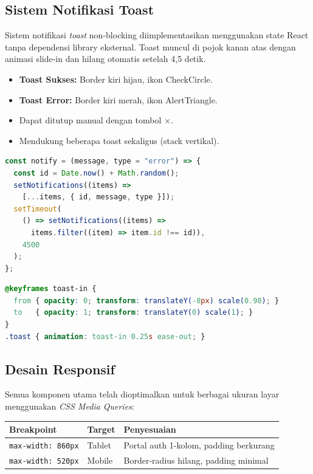 \documentclass[12pt,a4paper]{article}
\begin{document}
\subsection{Sistem Notifikasi Toast}

Sistem notifikasi \textit{toast} non-blocking diimplementasikan menggunakan state
React tanpa dependensi library eksternal. Toast muncul di pojok kanan atas dengan
animasi slide-in dan hilang otomatis setelah 4,5 detik.

\begin{itemize}[leftmargin=2em, itemsep=4pt]
  \item \textbf{Toast Sukses:} Border kiri hijau, ikon CheckCircle.
  \item \textbf{Toast Error:} Border kiri merah, ikon AlertTriangle.
  \item Dapat ditutup manual dengan tombol $\times$.
  \item Mendukung beberapa toast sekaligus (stack vertikal).
\end{itemize}

\begin{lstlisting}[language=JavaScript, caption=Fungsi notify dengan auto-dismiss]
const notify = (message, type = "error") => {
  const id = Date.now() + Math.random();
  setNotifications((items) =>
    [...items, { id, message, type }]);
  setTimeout(
    () => setNotifications((items) =>
      items.filter((item) => item.id !== id)),
    4500
  );
};
\end{lstlisting}

\begin{lstlisting}[language=CSS, caption=Animasi toast masuk]
@keyframes toast-in {
  from { opacity: 0; transform: translateY(-8px) scale(0.98); }
  to   { opacity: 1; transform: translateY(0) scale(1); }
}
.toast { animation: toast-in 0.25s ease-out; }
\end{lstlisting}

\subsection{Desain Responsif}

Semua komponen utama telah dioptimalkan untuk berbagai ukuran layar menggunakan
\textit{CSS Media Queries}:

\begin{center}
\begin{tabular}{lll}
  \toprule
  \textbf{Breakpoint} & \textbf{Target} & \textbf{Penyesuaian} \\
  \midrule
  \texttt{max-width: 860px} & Tablet & Portal auth 1-kolom, padding berkurang \\
  \texttt{max-width: 520px} & Mobile & Border-radius hilang, padding minimal \\
  \bottomrule
\end{tabular}
\end{center}
\end{document}
